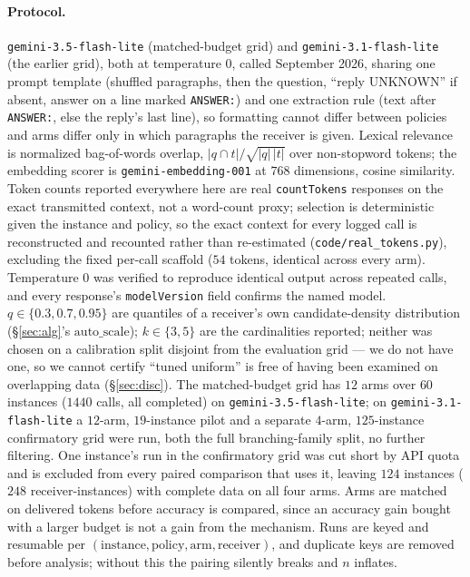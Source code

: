 \documentclass[sigconf,anonymous]{aamas}
\theoremstyle{remark}
\begin{document}
\paragraph{Protocol.} \texttt{gemini-3.5-flash-lite} (matched-budget
grid) and \texttt{gemini-3.1-flash-lite} (the earlier grid), both at
temperature $0$, called September 2026, sharing one prompt template
(shuffled paragraphs, then the question, ``reply UNKNOWN'' if absent,
answer on a line marked \texttt{ANSWER:}) and one extraction rule (text
after \texttt{ANSWER:}, else the reply's last line), so formatting
cannot differ between policies and arms differ only in which
paragraphs the receiver is given. Lexical relevance is normalized
bag-of-words overlap, $|q\cap t|/\sqrt{|q|\,|t|}$ over non-stopword
tokens; the embedding scorer is \texttt{gemini-embedding-001} at $768$
dimensions, cosine similarity. Token counts reported everywhere here
are real \texttt{countTokens} responses on the exact transmitted
context, not a word-count proxy; selection is deterministic given the
instance and policy, so the exact context for every logged call is
reconstructed and recounted rather than re-estimated
(\texttt{code/real\_tokens.py}), excluding the fixed per-call scaffold
($54$ tokens, identical across every arm). Temperature $0$ was
verified to reproduce identical output across repeated calls, and
every response's \texttt{modelVersion} field confirms the named model.
$q\in\{0.3,0.7,0.95\}$ are quantiles of a receiver's own
candidate-density distribution (\S\ref{sec:alg}'s
$\mathrm{auto\_scale}$); $k\in\{3,5\}$ are the cardinalities reported;
neither was chosen on a calibration split disjoint from the evaluation
grid --- we do not have one, so we cannot certify ``tuned uniform'' is
free of having been examined on overlapping data (\S\ref{sec:disc}).
The matched-budget grid has $12$ arms over $60$ instances ($1440$
calls, all completed) on \texttt{gemini-3.5-flash-lite}; on
\texttt{gemini-3.1-flash-lite} a $12$-arm, $19$-instance pilot and a
separate $4$-arm, $125$-instance confirmatory grid were run, both the
full branching-family split, no further filtering. One instance's run
in the confirmatory grid was cut short by API quota and is excluded
from every paired comparison that uses it, leaving $124$ instances
($248$ receiver-instances) with complete data on all four arms. Arms
are matched on delivered tokens before accuracy is compared, since an
accuracy gain bought with a larger budget is not a gain from the
mechanism. Runs are keyed and resumable per
$(\text{instance}, \text{policy}, \text{arm}, \text{receiver})$, and
duplicate keys are removed before analysis; without this the pairing
silently breaks and $n$ inflates.
\end{document}
